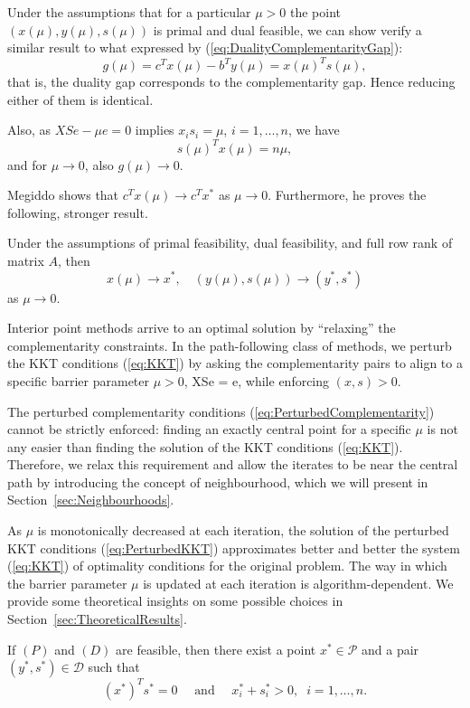 Under the assumptions that for a particular $\mu > 0$ the point
$(x(\mu),y(\mu),s(\mu))$ is primal and dual feasible, we can show
verify a similar result to what expressed by 
(\ref{eq:DualityComplementarityGap}):
\[
  g(\mu) = c^Tx(\mu) - b^T y(\mu) = x(\mu)^T s(\mu),
\]
that is, the duality gap corresponds to the complementarity gap.
Hence reducing either of them is identical.

Also, as $XSe - \mu e = 0$ implies $x_is_i = \mu$, $i = 1, \ldots, n$, 
we have
\[
   s(\mu)^T x(\mu) = n\mu,
\]
and for $\mu \to 0$, also $g(\mu) \to 0$.

Megiddo \cite{Megiddo} shows that $c^Tx(\mu)\to c^Tx^*$ as $\mu\to 0$. 
Furthermore, he proves the following, stronger result.
%
\begin{lemma}
Under the assumptions of primal feasibility, dual feasibility, and
full row rank of matrix $A$, then
\[
   x(\mu) \to x^*, \quad (y(\mu),s(\mu)) \to (y^*, s^*)
\]
as $\mu \to 0$.
\end{lemma}

Interior point methods arrive to an optimal solution by  ``relaxing'' 
the complementarity constraints.
In the path-following class of methods, we perturb the KKT
conditions (\ref{eq:KKT}) by asking the complementarity pairs to align 
to a specific barrier parameter $\mu > 0$,
\be  \label{eq:PerturbedComplementarity}
XSe = \mu e,
\ee
while enforcing $(x,s)>0$.

The perturbed complementarity conditions 
(\ref{eq:PerturbedComplementarity}) cannot be strictly enforced: 
finding an exactly central point for a specific $\mu$ is not any easier
than finding the solution of the KKT conditions (\ref{eq:KKT}). Therefore,
we relax this requirement and allow the iterates to be near the central
path by introducing the concept of neighbourhood, which we will present in
Section~\ref{sec:Neighbourhoods}.

As $\mu$ is monotonically decreased at each iteration, the solution of the 
perturbed KKT conditions (\ref{eq:PerturbedKKT}) approximates better and better
the system (\ref{eq:KKT}) of optimality conditions for the original
problem.
The way in which the barrier parameter $\mu$ is updated at each iteration
is algorithm-dependent. We provide some theoretical insights on some
possible choices in Section~\ref{sec:TheoreticalResults}.

\begin{theorem}
If $(P)$ and $(D)$ are feasible, then there exist a point $x^* \in\mathcal{P}$
and a pair $(y^*,s^*) \in \mathcal{D}$ such that
\[
(x^*)^T s^* = 0 \quad\mbox{ and }\quad x^*_i + s_i^* >0, \;\; i = 1, \ldots, n.
\]
\end{theorem}

